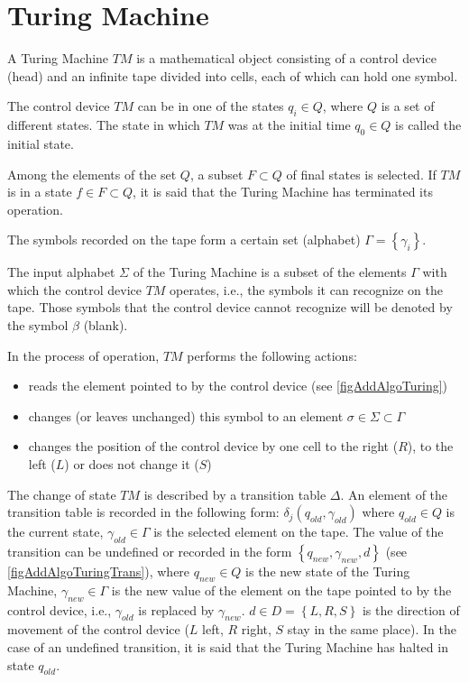\section{Turing Machine}
\label{addTuring}

A Turing Machine $TM$ is a mathematical object consisting of
a control device (head) and an infinite tape divided into
cells, each of which can hold one symbol.



The control device $TM$ can be in one of the states $q_i
\in Q$, where $Q$ 
is a set of different states. The state in which $TM$ was at
the initial time $q_0 \in Q$ is called the initial state.

Among the elements of the set $Q$, a subset $F \subset Q$
of final states is selected. If $TM$ is in a state $f \in F \subset
Q$, it is said that the Turing Machine has terminated its operation.

The symbols recorded on the tape form a certain set (alphabet)
$\Gamma = \left\{\gamma_i\right\}$.

The input alphabet $\Sigma$ of the Turing Machine is a 
subset of the elements $\Gamma$ with which the control device $TM$
operates, i.e., the symbols it can recognize on the tape. Those symbols
that the control device cannot recognize will be denoted by the symbol
$\beta$ (blank).

In the process of operation, $TM$ performs the following actions:
\begin{itemize}
\item{reads the element pointed to by the control device
  (see \autoref{figAddAlgoTuring})}
\item{changes (or leaves unchanged) this symbol to an element
  $\sigma \in \Sigma \subset \Gamma$}
\item{changes the position of the control device by one cell to the right
  ($R$), to the left ($L$) or does not change it ($S$)}
\end{itemize}



The change of state $TM$ is described by a transition table
$\Delta$. An element of the transition table is recorded in the following form: 
$\delta_j\left(q_{old}, \gamma_{old}\right)$ where $q_{old} \in Q$ is the current state,
$\gamma_{old} \in \Gamma$ is the selected element on the tape. The value
of the transition can be 
undefined or recorded in the form $\left\{q_{new}, \gamma_{new},
d\right\}$ (see \autoref{figAddAlgoTuringTrans}), where
$q_{new} \in Q$ is the new state of the Turing Machine, $\gamma_{new} \in \Gamma$ is the
new value of the element on the tape pointed to by the control device,
i.e., $\gamma_{old}$ is replaced by $\gamma_{new}$. $d \in D =
\left\{L, R, S\right\}$ is the direction of 
movement of the control device ($L$ left, $R$ right, $S$
stay in the same place). In the case of an undefined
transition, it is said that the Turing Machine has halted in state $q_{old}$.

